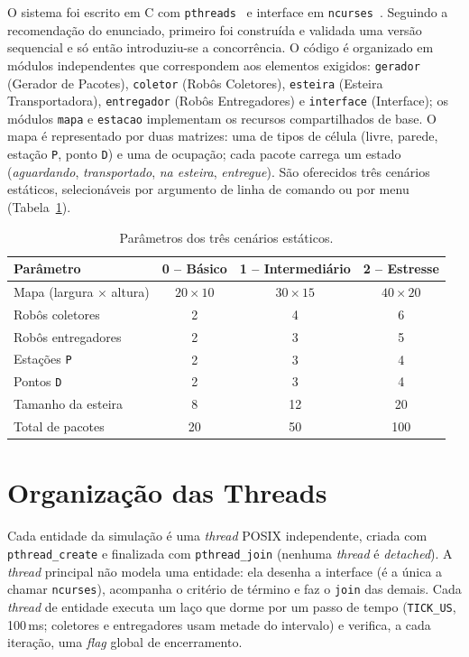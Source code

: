 \documentclass[12pt]{article}
\begin{document}
O sistema foi escrito em C com \texttt{pthreads}~\cite{tanenbaum} e interface em
\texttt{ncurses}~\cite{ncurses}. Seguindo a recomendação do enunciado, primeiro
foi construída e validada uma versão sequencial e só então introduziu-se a
concorrência. O código é organizado em módulos independentes que correspondem aos
elementos exigidos: \texttt{gerador} (Gerador de Pacotes), \texttt{coletor}
(Robôs Coletores), \texttt{esteira} (Esteira Transportadora), \texttt{entregador}
(Robôs Entregadores) e \texttt{interface} (Interface); os módulos \texttt{mapa} e
\texttt{estacao} implementam os recursos compartilhados de base. O mapa é
representado por duas matrizes: uma de tipos de célula (livre, parede, estação
\texttt{P}, ponto \texttt{D}) e uma de ocupação; cada pacote carrega um estado
(\emph{aguardando}, \emph{transportado}, \emph{na esteira}, \emph{entregue}).
São oferecidos três cenários estáticos, selecionáveis por argumento de linha de
comando ou por menu (Tabela~\ref{tab:cenarios}).

\begin{table}[ht]
\centering
\caption{Parâmetros dos três cenários estáticos.}
\label{tab:cenarios}
\small
\begin{tabular}{lccc}
\hline
\textbf{Parâmetro} & \textbf{0 -- Básico} & \textbf{1 -- Intermediário} & \textbf{2 -- Estresse} \\
\hline
Mapa (largura $\times$ altura) & $20\times10$ & $30\times15$ & $40\times20$ \\
Robôs coletores        & 2 & 4 & 6 \\
Robôs entregadores     & 2 & 3 & 5 \\
Estações \texttt{P}    & 2 & 3 & 4 \\
Pontos \texttt{D}      & 2 & 3 & 4 \\
Tamanho da esteira     & 8 & 12 & 20 \\
Total de pacotes       & 20 & 50 & 100 \\
\hline
\end{tabular}
\end{table}

\section{Organização das Threads}

Cada entidade da simulação é uma \textit{thread} POSIX independente, criada com
\texttt{pthread\_create} e finalizada com \texttt{pthread\_join} (nenhuma
\textit{thread} é \textit{detached}). A \textit{thread} principal não modela uma
entidade: ela desenha a interface (é a única a chamar \texttt{ncurses}),
acompanha o critério de término e faz o \texttt{join} das demais. Cada
\textit{thread} de entidade executa um laço que dorme por um passo de tempo
(\texttt{TICK\_US}, 100\,ms; coletores e entregadores usam metade do intervalo) e
verifica, a cada iteração, uma \textit{flag} global de encerramento.
\end{document}
